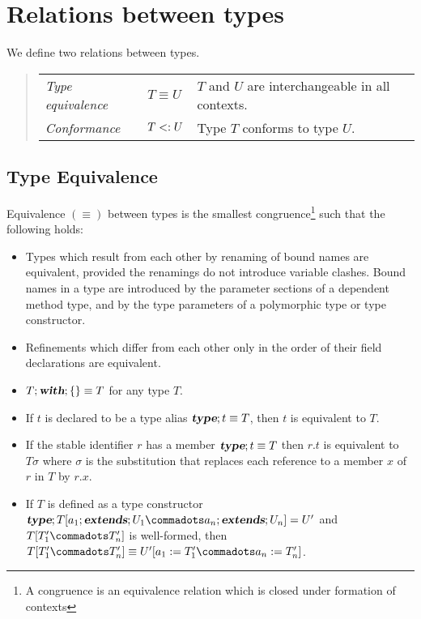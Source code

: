 \documentclass[11pt]{report}
\begin{document}
\section{Relations between types}

We define two relations between types.
\begin{quote}\begin{tabular}{l@{\tab}l@{\tab}l}
\em Type equivalence & $T \equiv U$ & $T$ and $U$ are interchangeable
in all contexts.
\\
\em Conformance & $T <: U$ & Type $T$ conforms to type $U$.
\end{tabular}\end{quote}

\subsection{Type Equivalence}
\label{sec:type-equiv}

Equivalence $(\equiv)$ between types is the smallest congruence\footnote{ A
congruence is an equivalence relation which is closed under formation
of contexts} such that the following holds:
\begin{itemize}
\item
Types which result from each other by renaming of bound names are
equivalent, provided the renamings do not introduce variable clashes.
Bound names in a type are introduced by the parameter sections of a
dependent method type, and by the type parameters of a polymorphic
type or type constructor.
\item
Refinements which differ from each other only in the order of their field
declarations are equivalent.
\item
$T; \mbox{\sl\bfseries with}; \{\} \equiv T$ for any type $T$.
\item
If $t$ is declared to be a type alias $\mbox{\sl\bfseries type};t \equiv T$, then $t$ is
equivalent to $T$.
\item
If the stable identifier $r$ has a member $\mbox{\sl\bfseries type};t \equiv T$ then $r.t$ is
equivalent to $T\sigma$ where $\sigma$ is the substitution that replaces each
reference to a member $x$ of $r$ in $T$ by $r.x$.
\item
If $T$ is defined as a type constructor
$\TYPE;T[a_1 \extends U_1 \commadots a_n \extends U_n] = U'$
and $T[T'_1 \commadots T'_n]$ is well-formed, then
$T[T'_1 \commadots T'_n] \equiv U'[a_1 := T'_1 \commadots a_n := T'_n]$.
\end{itemize}
\end{document}
